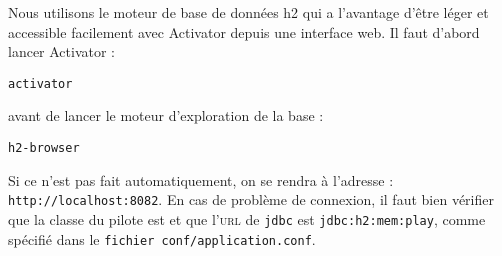 \documentclass[11pt]{article}
\begin{document}
Nous utilisons le moteur de base de données h2 qui a l'avantage d'être léger et accessible facilement avec Activator depuis une interface web. Il faut d'abord lancer Activator :
\begin{center}\texttt{activator}\end{center}
avant de lancer le moteur d'exploration de la base :
\begin{center}\texttt{h2-browser}\end{center}
Si ce n'est pas fait automatiquement, on se rendra à l'adresse : \texttt{http://localhost:8082}. En cas de problème de connexion, il faut bien vérifier que la classe du pilote est \texttt{} et que l'\textsc{url} de \texttt{jdbc} est \texttt{jdbc:h2:mem:play}, comme spécifié dans le \texttt{fichier conf/application.conf}.
\end{document}
